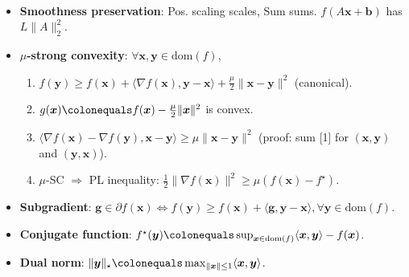 \documentclass[8pt,a4paper]{extarticle}
\renewcommand{\vec}[1]{\bm{#1}}
\newcommand{\mat}[1]{#1}
\newcommand{\dom}[1]{\mathrm{dom}(#1)}
\newenvironment{topic}[1]
{\textbf{\sffamily \colorbox{black}{\rlap{\textbf{\textcolor{white}{#1}}}\hspace{\linewidth}\hspace{-2\fboxsep}}} \\ \vspace{0.2cm}}
{}
\begin{document}
\begin{multicols*}{2}
\begin{topic}{Definitions}
\begin{itemize}
            \item \textbf{Smoothness preservation}: Pos. scaling scales, Sum sums. $f(\mat{A} \vec{x} + \vec{b})$ has $L \| \mat{A} \|_2^2$.
            \item \textbf{$\mu$-strong convexity}: $\forall \vec{x}, \vec{y} \in \dom{f}$,
                  \begin{enumerate}
                      \item $f(\vec{y}) \geq f(\vec{x}) + \langle \nabla f(\vec{x}), \vec{y} - \vec{x} \rangle + \frac{\mu}{2} \| \vec{x} - \vec{y} \|^2$ (canonical).
                      \item $g(\vec{x}) \colonequals f(\vec{x}) - \frac{\mu}{2} \| \vec{x} \|^2$ is convex.
                      \item $\langle \nabla f(\vec{x}) - \nabla f(\vec{y}), \vec{x} - \vec{y} \rangle \geq \mu \| \vec{x} - \vec{y} \|^2$ (proof: sum [1] for $(\vec{x}, \vec{y})$ and $(\vec{y}, \vec{x})$).
                      \item $\mu$-SC $\Rightarrow$ PL inequality: $\frac{1}{2} \| \nabla f(\vec{x}) \|^2 \geq \mu (f(\vec{x}) - f^\star)$.
                  \end{enumerate}
            \item \textbf{Subgradient}: $\vec{g} \in \partial f(\vec{x}) \Leftrightarrow f(\vec{y}) \geq f(\vec{x}) + \langle \vec{g}, \vec{y} - \vec{x} \rangle, \forall \vec{y} \in \dom{f}$.
            \item \textbf{Conjugate function}: $f^\star(\vec{y}) \colonequals \sup_{\vec{x} \in \dom{f}} \langle \vec{x}, \vec{y} \rangle - f(\vec{x})$.
            \item \textbf{Dual norm}: $\| \vec{y} \|_\star \colonequals \max_{\| \vec{x} \| \leq 1} \langle \vec{x}, \vec{y} \rangle$.
        \end{itemize}
    \end{topic}


\end{multicols*}
\end{document}

